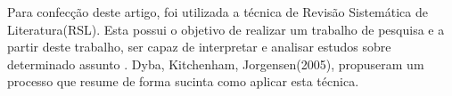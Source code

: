 Para confecção deste artigo, foi utilizada a técnica de Revisão Sistemática de Literatura(RSL). Esta possui o objetivo de realizar um trabalho de pesquisa e a partir deste trabalho, ser capaz de interpretar e analisar estudos sobre determinado assunto \cite{brereton}. Dyba, Kitchenham,  Jorgensen(2005), propuseram um processo que resume de forma sucinta como aplicar esta técnica.

